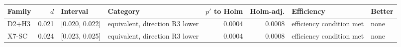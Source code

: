 \begin{tabular}{@{}lrllrrll@{}}\toprule
Family & $d$ & Interval & Category & $p'$ to Holm & Holm-adj. & Efficiency & Better \\\midrule
D2+H3 & 0.021 & [0.020, 0.022] & equivalent, direction R3 lower & 0.0004 & 0.0008 & efficiency condition met & none \\
X7-SC & 0.024 & [0.023, 0.025] & equivalent, direction R3 lower & 0.0004 & 0.0008 & efficiency condition met & none \\
\bottomrule\end{tabular}

